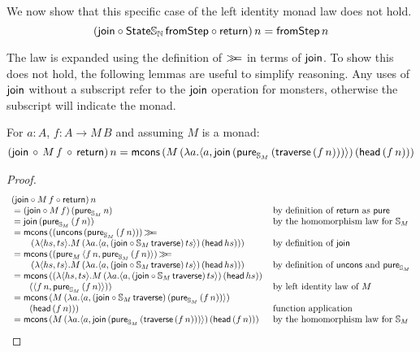 We now show that this specific case of the left identity monad law does not hold. 
$$
(\mathsf{join} \circ \mathsf{State}\mathbb{S}_{\mathbb{N}}\, \mathsf{fromStep} \circ \mathsf{return})\, n = \mathsf{fromStep}\, n
$$

The law is expanded using the definition of $\mathbin{\gg\!\!=}$ in terms of $\mathsf{join}$. 
To show this does not hold, the following lemmas are useful to simplify reasoning. Any uses of $\mathsf{join}$ without a subscript refer to the $\mathsf{join}$ operation for monsters, otherwise the subscript will indicate the monad.

\begin{lemma}\label{lemma:general_bind_law}
For $a : A$, $f : A \rightarrow M\, B$ and assuming $M$ is a monad:
$$
(\mathsf{join}\, \circ\,  M\, f\, \circ\, \mathsf{return})\, n = \mathsf{mcons}\, (M\,(\lambda a . \langle a, \mathsf{join}\, (\mathsf{pure}_{\mathbb{S}_{M}}\, (\mathsf{traverse}\, (f\, n))) \rangle)\, (\mathsf{head}\, (f\, n)))
$$
\end{lemma}

\begin{proof}
$$
\begin{array}{ll}
(\join \comp  M\, f \comp \return)\, n \\
{}= (\join \comp  M\, f)\, (\apure_{\stream{M}}\, n)
  & \mbox{by definition of } \return \mbox{ as } \apure \\
{}= \join\, (\apure_{\stream{M}}\, (f \,n))
  & \mbox{by the homomorphism law for } \stream{M}\\
{}= \mcons\, ((\uncons\, (\apure_{\stream{M}}\, (f\, n)))\, \bind \\\qquad \,(\lambda \pair{hs}{ts} . M\,(\lambda a . \pair{a}{(\join \comp \stream{M}\,\mathsf{traverse})\, ts})\, (\head\, hs)))
  & \mbox{by definition of } \join \\
{}= \mcons\,((\apure_{M}\,\pair{f\, n}{\apure_{\stream{M}}\,(f\, n)})\, \bind \\\qquad \,(\lambda \pair{hs}{ts} . M\,(\lambda a . \pair{a}{(\join \comp \stream{M}\, \mathsf{traverse})\, ts})\, (\head\, hs)))
  & \mbox{by definition of } \uncons \mbox{ and } \apure_{\stream{M}} \\
{}= \mcons\, ((\lambda \pair{hs}{ts} . M\,(\lambda a . \pair{a}{(\join \comp \stream{M}\,\mathsf{traverse})\, ts})\, (\head\, hs)) \, \\\qquad (\pair{f\, n}{\apure_{\stream{M}}\,(f\, n)}))
  & \mbox{by left identity law of } M \\
{}= \mcons\,(M\,(\lambda a . \pair{a}{(\join \comp \stream{M}\,\mathsf{traverse})\, (\apure_{\stream{M}}\,(f\, n))})\, \\ \qquad (\head\, (f\, n)))
 & \mbox{function application} \\
 {}= \mcons\, (M\,(\lambda a . \pair{a}{\join\, (\apure_{\stream{M}}\, (\mathsf{traverse}\, (f\, n)))})\, (\head\, (f\, n)))
 & \mbox{by the homomorphism law for } \stream{M}\\

\end{array} 
$$
\end{proof}



